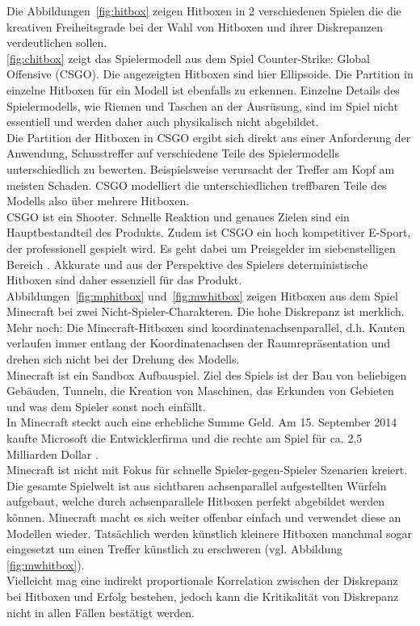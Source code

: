 Die Abbildungen~\ref{fig:hitbox} zeigen Hitboxen in 2 verschiedenen Spielen die die kreativen Freiheitsgrade bei der Wahl von Hitboxen und ihrer Diskrepanzen verdeutlichen sollen.\\
\ref{fig:chitbox} zeigt das Spielermodell aus dem Spiel Counter-Strike: Global Offensive (CSGO). Die angezeigten Hitboxen sind hier Ellipsoide.
Die Partition in einzelne Hitboxen für ein Modell ist ebenfalls zu erkennen.
Einzelne Details des Spielermodells, wie Riemen und Taschen an der Ausrüsung, sind im Spiel nicht essentiell und werden daher auch physikalisch nicht abgebildet.\\
Die Partition der Hitboxen in CSGO ergibt sich direkt aus einer Anforderung der Anwendung, Schusstreffer auf verschiedene Teile des Spielermodells unterschiedlich zu bewerten. Beispielsweise verursacht der Treffer am Kopf am meisten Schaden. CSGO modelliert die unterschiedlichen treffbaren Teile des Modells also über mehrere Hitboxen.\\
CSGO ist ein Shooter. Schnelle Reaktion und genaues Zielen sind ein Hauptbestandteil des Produkts. Zudem ist CSGO ein hoch kompetitiver E-Sport, der professionell gespielt wird. Es geht dabei um Preisgelder im siebenstelligen Bereich \cite{csgoprice}. Akkurate und aus der Perspektive des Spielers deterministische Hitboxen sind daher essenziell für das Produkt.\\
Abbildungen~\ref{fig:mphitbox} und~\ref{fig:mwhitbox} zeigen Hitboxen aus dem Spiel Minecraft bei zwei Nicht-Spieler-Charakteren. Die hohe Diskrepanz ist merklich. Mehr noch: Die Minecraft-Hitboxen sind koordinatenachsenparallel, d.h. Kanten verlaufen immer entlang der Koordinatenachsen der Raumrepräsentation und drehen sich nicht bei der Drehung des Modells.\\
Minecraft ist ein Sandbox Aufbauspiel. Ziel des Spiels ist der Bau von beliebigen Gebäuden, Tunneln, die Kreation von Maschinen, das Erkunden von Gebieten und was dem Spieler sonst noch einfällt.\\
In Minecraft steckt auch eine erhebliche Summe Geld. Am 15. September 2014 kaufte Microsoft die Entwicklerfirma und die rechte am Spiel für ca. 2,5 Milliarden Dollar \cite{buyminecraft}.\\
Minecraft ist nicht mit Fokus für schnelle Spieler-gegen-Spieler Szenarien kreiert. Die gesamte Spielwelt ist aus sichtbaren achsenparallel aufgestellten Würfeln aufgebaut, welche durch achsenparallele Hitboxen perfekt abgebildet werden können. Minecraft macht es sich weiter offenbar einfach und verwendet diese an Modellen wieder. Tatsächlich werden künstlich kleinere Hitboxen manchmal sogar eingesetzt um einen Treffer künstlich zu erschweren (vgl. Abbildung \ref{fig:mwhitbox}).\\
Vielleicht mag eine indirekt proportionale Korrelation zwischen der Diskrepanz bei Hitboxen und Erfolg bestehen, jedoch kann die Kritikalität von Diskrepanz nicht in allen Fällen bestätigt werden.

